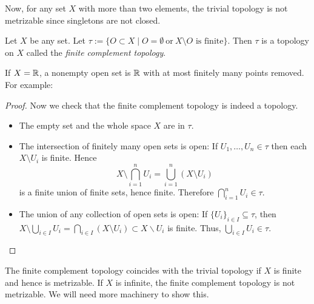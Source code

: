 Now, for any set $X$ with more than two elements, the trivial topology is not metrizable since singletons are not closed.

\begin{example}
   Let $X$ be any set. Let ${\tau}:=\{O\subset X\mid O=\emptyset\ \text{or}\ X\setminus O \text{ is finite}\}$. Then ${\tau}$ is a topology on $X$ called the \emph{finite complement topology}.

    If $X=\mathbb{R}$, a nonempty open set is $\mathbb{R}$ with at most finitely many points removed. For example:
      \begin{center}
      \end{center}
\end{example}
\begin{proof}
  Now we check that the finite complement topology is indeed a topology.
  \begin{itemize}
    \item The empty set and the whole space $X$ are in ${\tau}$.
    \item The intersection of finitely many open sets is open: If $U_1,\dots,U_n\in{\tau}$ then each $X\setminus U_i$ is finite. Hence
    \[
    X\setminus\bigcap_{i=1}^n U_i=\bigcup_{i=1}^n (X\setminus U_i)
    \]
    is a finite union of finite sets, hence finite. Therefore $\bigcap_{i=1}^n U_i\in{\tau}$.
    \item The union of any collection of open sets is open: If $\{U_i\}_{i\in I}\subseteq{\tau}$, then $X\setminus\bigcup_{i\in I} U_i = \bigcap_{i\in I} (X\setminus U_i)\subset X\backslash U_i$ is finite. Thus, $\bigcup_{i\in I} U_i\in{\tau}$.
  \end{itemize}
\end{proof}

The finite complement topology coincides with the trivial topology if $X$ is finite and hence is metrizable. If $X$ is infinite, the finite complement topology is not metrizable. We will need more machinery to show this.  

